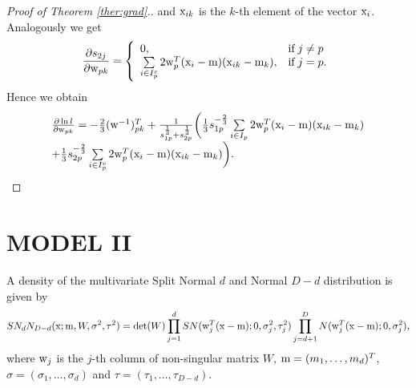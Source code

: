 \begin{proof}[Proof of Theorem \ref{ther:grad}.]
and $\mathrm{x}_{ik}$ is the $k$-th element of the vector $\mathrm{x}_i$. Analogously we get
$$\frac{\partial {s}_{2j}}{\partial \mathrm{w}_{pk}} = \left\{ \begin{array}{ll}
0, & \text{if} \; j\neq p\\
\sum\limits_{ i \in {I}_p^c} 2 \mathrm{w}^T_p (\mathrm{x}_i - \mathrm{m}) (\mathrm{x}_{ik} - \mathrm{m}_k), & \text{if} \; j=p.
\end{array} \right.
$$
Hence we obtain %
$$
\begin{array}{l}
\frac{\partial \ln {l}}{\partial \mathrm{w}_{pk}} = -\frac{2}{3} (\mathrm{w}^{-1})^T_{pk} + \frac{1}{{s}_{1p}^{\frac{1}{3}} +{s}_{2p}^{\frac{1}{3}}} 
 \bigg(
\frac{1}{3} {s}_{1p}^{-\frac{2}{3}} \sum\limits_{ i \in {I}_p} 2 \mathrm{w}^T_p (\mathrm{x}_i - \mathrm{m}) (\mathrm{x}_{ik} - \mathrm{m}_k)\\[6pt]
+ \frac{1}{3} {s}_{2p}^{-\frac{2}{3}} \sum\limits_{ i \in {I}_p^c} 2 \mathrm{w}^T_p (\mathrm{x}_i - \mathrm{m}) (\mathrm{x}_{ik} - \mathrm{m}_k) \bigg).
\end{array}
$$
\end{proof}



\section{MODEL II}

\begin{definition}\label{def:GSN}
A density of the multivariate Split Normal $d$ and Normal $D-d$ distribution is given by
$$
 SN_{d}N_{D-d}(\mathrm{x}; \mathrm{m},W, \sigma^2,\tau^2)=\det(W) \prod_{j=1}^{d} SN(\mathrm{w}_j^T(\mathrm{x}-\mathrm{m});0,\sigma_j^2,\tau_j^2)\prod_{j=d+1}^{D} N(\mathrm{w}_j^T(\mathrm{x}-\mathrm{m});0,\sigma_j^2),
$$
where $\mathrm{w}_{j}$ is the $j$-th column of non-singular matrix $W$, $\mathrm{m} = (m_1, \ldots, m_d)^T$, $\sigma = (\sigma_{1},\ldots,\sigma_{d})$ and $\tau=(\tau_{1},\ldots,\tau_{D-d})$.
\end{definition}

